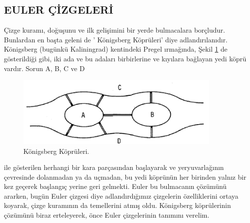 \documentclass[11pt]{amsbook}
\begin{document}
\subsection{EULER ÇİZGELERİ}
	Çizge kuramı, doğuşunu ve ilk gelişimini bir yerde 
	bulmacalara borçludur. Bunlardan en başta geleni 
	de ' Königsberg Köprüleri'  diye adlandırılanıdır. 
	Königsberg (bugünkü Kaliningrad) kentindeki Pregel 
	ırmağında, Şekil \ref{fig:2.5.1} de gösterildiği gibi, iki 
	ada ve bu adaları birbirlerine ve kıyılara 
	bağlayan yedi köprü vardır. Sorun A, B, C ve D 
	\begin{figure}[h] \centering \includegraphics[width=0.9\textwidth,keepaspectratio=true]{images/ceyhun-078-fig01}\caption{ Königsberg Köprüleri.} \label{fig:2.5.1} \end{figure}
	ile gösterilen herhangi bir kara parçasından 
	başlayarak ve yeryuvarlağının çevresinde dolanmadan 
	ya da uçmadan, bu yedi köprünün her birinden yalnız  
	bir kez geçerek başlangıç yerine geri gelmekti. 
	Euler bu bulmacanın çözümünü ararken, bugün Euler 
	çizgesi diye adlandırdığımız çizgelerin 
	özelliklerini ortaya koyarak, çizge kuramının da 
	temellerini atmış oldu. Königsberg köprülerinin 
	çözümünü biraz erteleyerek, önce Euler çizgelerinin 
	tanımını verelim.
\end{document}
